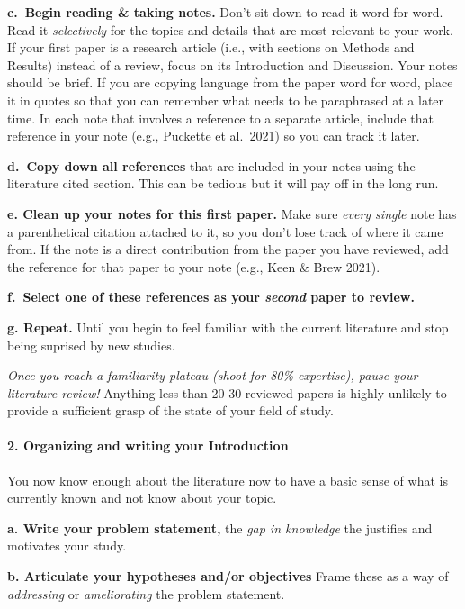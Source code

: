 \documentclass[
]{book}
\begin{document}
\textbf{c.~Begin reading \& taking notes.} Don't sit down to read it word for word. Read it \emph{selectively} for the topics and details that are most relevant to your work. If your first paper is a research article (i.e., with sections on Methods and Results) instead of a review, focus on its Introduction and Discussion. Your notes should be brief. If you are copying language from the paper word for word, place it in quotes so that you can remember what needs to be paraphrased at a later time. In each note that involves a reference to a separate article, include that reference in your note (e.g.,
Puckette et al.~2021) so you can track it later.

\textbf{d.~Copy down all references} that are included in your notes using the literature cited section. This can be tedious but it will pay off in the long run.

\textbf{e. Clean up your notes for this first paper.} Make sure \emph{every single} note has a parenthetical citation attached to it, so you don't lose track of where it came from. If the note is a direct contribution from the paper you have reviewed, add the reference for that paper to your note (e.g., Keen \& Brew 2021).

\textbf{f.~Select one of these references as your \emph{second} paper to review.}

\textbf{g. Repeat.} Until you begin to feel familiar with the current literature and stop being suprised by new studies.

\emph{Once you reach a familiarity plateau (shoot for 80\% expertise), pause your literature review!} Anything less than 20-30 reviewed papers is highly unlikely to provide a sufficient grasp of the state of your field of study.

\hypertarget{organizing-and-writing-your-introduction}{%
\paragraph{2. Organizing and writing your Introduction}\label{organizing-and-writing-your-introduction}}

You now know enough about the literature now to have a basic sense of what is currently known and not know about your topic.

\textbf{a. Write your problem statement,} the \emph{gap in knowledge} the justifies and motivates your study.

\textbf{b. Articulate your hypotheses and/or objectives} Frame these as a way of \emph{addressing} or \emph{ameliorating} the problem statement.
\end{document}
